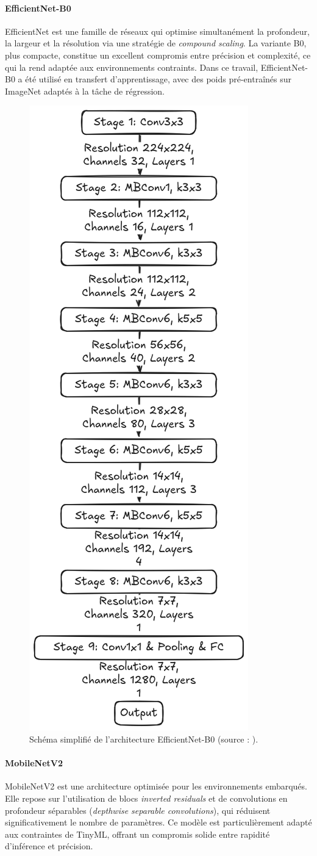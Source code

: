\paragraph{EfficientNet-B0}
EfficientNet \cite{tanle2019} est une famille de réseaux qui optimise simultanément la profondeur, la largeur et la résolution via une stratégie de \emph{compound scaling}.  
La variante B0, plus compacte, constitue un excellent compromis entre précision et complexité, ce qui la rend adaptée aux environnements contraints.  
Dans ce travail, EfficientNet-B0 a été utilisé en transfert d’apprentissage, avec des poids pré-entraînés sur ImageNet adaptés à la tâche de régression.

\begin{figure}[H]
    \centering
	\footnotesize
    \includegraphics[width=0.3\linewidth]{figures/efficientnetb0.png}
    \caption{Schéma simplifié de l’architecture EfficientNet-B0 (source : \cite{tanle2019}).}
    \label{fig:efficientnetb0}
\end{figure}

\paragraph{MobileNetV2}
MobileNetV2 \cite{sandler2018mobilenetv2} est une architecture optimisée pour les environnements embarqués.  
Elle repose sur l’utilisation de blocs \emph{inverted residuals} et de convolutions en profondeur séparables (\emph{depthwise separable convolutions}), qui réduisent significativement le nombre de paramètres.  
Ce modèle est particulièrement adapté aux contraintes de TinyML, offrant un compromis solide entre rapidité d’inférence et précision.

